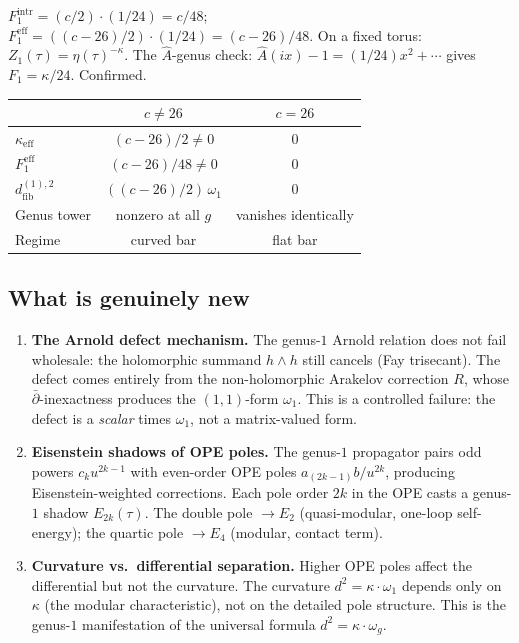 \documentclass[11pt]{article}
\newcommand{\dfib}{d_{\mathrm{fib}}}
\begin{document}
$F_1^{\mathrm{intr}} = (c/2)\cdot(1/24) = c/48$;
$F_1^{\mathrm{eff}} = ((c{-}26)/2)\cdot(1/24) = (c{-}26)/48$.
On a fixed torus: $Z_1(\tau) = \eta(\tau)^{-\kappa}$.  The
$\hat{A}$-genus check:
$\hat{A}(ix) - 1 = (1/24)x^2 + \cdots$ gives
$F_1 = \kappa/24$.  Confirmed.

\medskip
\begin{center}
\renewcommand{\arraystretch}{1.15}
\begin{tabular}{@{}lcc@{}}
& $c \neq 26$ & $c = 26$ \\
\hline
$\kappa_{\mathrm{eff}}$ & $(c{-}26)/2 \neq 0$ & $0$ \\
$F_1^{\mathrm{eff}}$ & $(c{-}26)/48 \neq 0$ & $0$ \\
$\dfib^{(1),2}$ & $((c{-}26)/2)\,\omega_1$ & $0$ \\
Genus tower & nonzero at all $g$ & vanishes identically \\
Regime & curved bar & flat bar
\end{tabular}
\end{center}

\subsection*{What is genuinely new}

\begin{enumerate}
\item \textbf{The Arnold defect mechanism.}  The genus-$1$ Arnold
  relation does not fail wholesale: the holomorphic summand
  $h\wedge h$ still cancels (Fay trisecant).  The defect comes
  entirely from the non-holomorphic Arakelov correction $R$,
  whose $\bar\partial$-inexactness produces the $(1,1)$-form
  $\omega_1$.  This is a controlled failure: the defect is a
  \emph{scalar} times $\omega_1$, not a matrix-valued form.
\item \textbf{Eisenstein shadows of OPE poles.}  The genus-$1$
  propagator pairs odd powers $c_k u^{2k-1}$ with even-order OPE
  poles $a_{(2k-1)}b/u^{2k}$, producing Eisenstein-weighted
  corrections.  Each pole order $2k$ in the OPE casts a genus-$1$
  shadow $E_{2k}(\tau)$.  The double pole $\to E_2$ (quasi-modular,
  one-loop self-energy); the quartic pole $\to E_4$ (modular,
  contact term).
\item \textbf{Curvature vs.\ differential separation.}  Higher
  OPE poles affect the differential but not the curvature.  The
  curvature $d^2 = \kappa\cdot\omega_1$ depends only on $\kappa$
  (the modular characteristic), not on the detailed pole structure.
  This is the genus-$1$ manifestation of the universal
  formula $d^2 = \kappa\cdot\omega_g$.
\end{enumerate}
\end{document}
